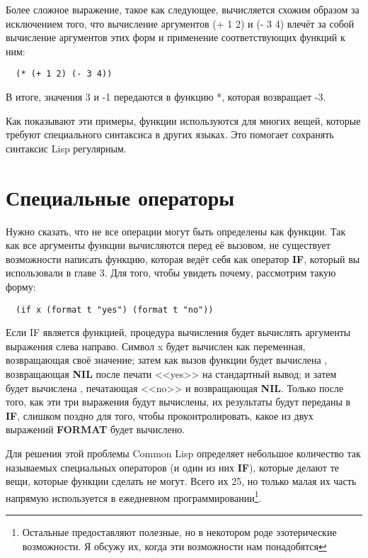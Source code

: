Более сложное выражение, такое как следующее, вычисляется схожим образом за исключением
того, что вычисление аргументов (+ 1 2) и (- 3 4) влечёт за собой вычисление аргументов
этих форм и применение соответствующих функций к ним:

\begin{lstlisting}
  (* (+ 1 2) (- 3 4))
\end{lstlisting}

В итоге, значения 3 и -1 передаются в функцию *, которая возвращает -3.

Как показывают эти примеры, функции используются для многих вещей, которые требуют
специального синтаксиса в других языках. Это помогает сохранять синтаксис Lisp регулярным.

\section{Специальные операторы}

Нужно сказать, что не все операции могут быть определены как функции. Так как все
аргументы функции вычисляются перед её вызовом, не существует возможности написать
функцию, которая ведёт себя как оператор \textbf{IF}, который вы использовали в главе
3. Для того, чтобы увидеть почему, рассмотрим такую форму:

\begin{lstlisting}
  (if x (format t "yes") (format t "no"))
\end{lstlisting}

Если IF является функцией, процедура вычисления будет вычислять аргументы выражения слева
направо. Символ x будет вычислен как переменная, возвращающая своё значение; затем как
вызов функции будет вычислена , возвращающая \textbf{NIL} после
печати <<yes>> на стандартный вывод; и затем будет вычислена , печатающая
<<no>> и возвращающая \textbf{NIL}. Только после того, как эти три выражения будут
вычислены, их результаты будут переданы в \textbf{IF}, слишком поздно для того, чтобы
проконтролировать, какое из двух выражений \textbf{FORMAT} будет вычислено.

Для решения этой проблемы Common Lisp определяет небольшое количество так называемых
специальных операторов (и один из них \textbf{IF}), которые делают те вещи, которые
функции сделать не могут. Всего их 25, но только малая их часть напрямую используется в
ежедневном программировании\footnote{Остальные предоставляют полезные, но в некотором роде
  эзотерические возможности. Я обсужу их, когда эти возможности нам понадобятся}.

